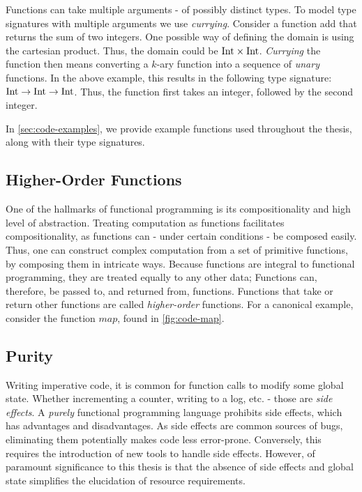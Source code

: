 Functions can take multiple arguments - of possibly distinct types. To model type signatures with multiple arguments we use \emph{currying}. Consider a function add that returns the sum of two integers. One possible way of defining the domain is using the cartesian product. Thus, the domain could be \(\text{Int} \times \text{Int}\). \emph{Currying} the function then means converting a \(k\)-ary function into a sequence of \emph{unary} functions. In the above example, this results in the following type signature: \(\text{Int} \to \text{Int} \to \text{Int}\). Thus, the function first takes an integer, followed by the second integer. 


In \cref{sec:code-examples}, we provide example functions used throughout the thesis, along with their type signatures.

\subsection{Higher-Order Functions}

One of the hallmarks of functional programming is its compositionality and high level of abstraction. Treating computation as functions facilitates compositionality, as functions can - under certain conditions - be composed easily. Thus, one can construct complex computation from a set of primitive functions, by composing them in intricate ways. Because functions are integral to functional programming, they are treated equally to any other data; Functions can, therefore, be passed to, and returned from, functions. Functions that take or return other functions are called \emph{higher-order} functions. For a canonical example, consider the function \(map\), found in \cref{fig:code-map}.


\subsection{Purity}

Writing imperative code, it is common for function calls to modify some global state. Whether incrementing a counter, writing to a log, etc. - those are \emph{side effects}. A \emph{purely} functional programming language prohibits side effects, which has advantages and disadvantages. As side effects are common sources of bugs, eliminating them potentially makes code less error-prone. Conversely, this requires the introduction of new tools to handle side effects. However, of paramount significance to this thesis is that the absence of side effects and global state simplifies the elucidation of resource requirements. 


